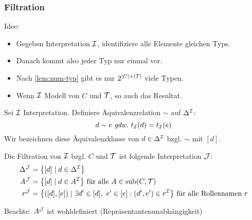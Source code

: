 \subsubsection{Filtration}\label{filtration}
Idee:

\begin{itemize}
  \item Gegeben Interpretation $\mathcal{I}$, identifiziere alle Elemente gleichen Typs.
  \item Danach kommt also jeder Typ nur einmal vor.
  \item Nach \autoref{lem:num-typ} gibt es nur $2^{|C|+|\mathcal{T}|}$ viele Typen.
  \item Wenn $\mathcal{I}$ Modell von $C$ und $\mathcal{T}$, so auch das Resultat.
\end{itemize}

\begin{definition}[Filtration]

Sei $\mathcal{I}$ Interpretation. Definiere Äquivalenzrelation $\sim$ auf
$\Delta^{\mathcal{I}}$: $$d \sim e \gdw t_\MI\left( d \right) = t_\MI\left( e \right)$$
Wir bezeichnen diese Äquivalenzklasse von $d \in \Delta^{\mathcal{I}}$ bzgl. $\sim$ mit $\left\lbrack d \right\rbrack$.

Die Filtration von $\mathcal{I}$ bzgl. $C$ und $\mathcal{T}$ ist folgende Interpretation $\mathcal{J}$:
\begin{align*}
    \Delta^{\MJ} &= \left\{ \left\lbrack d \right\rbrack \mid d \in \Delta^\MI \right\}\\
    A^{\MJ} &= \left\{ \left\lbrack d \right\rbrack \mid d \in A^\MI \right\}
  \text{ für alle }A \in \sub\left( C,\MT \right)\\
  r^{\MJ} &= \left\{ \left( \left\lbrack d \right\rbrack,\left\lbrack e \right\rbrack \right) \mid \exists d' \in \left\lbrack d \right\rbrack,\ e' \in \left\lbrack e \right\rbrack:\left( d',e' \right) \in r^\MI \right\}
  \text{ für alle Rollennamen } r
\end{align*}

Beachte: $A^{\mathcal{J}}$ ist wohldefiniert (Repräsentantenunabhängigkeit)
\end{definition}

